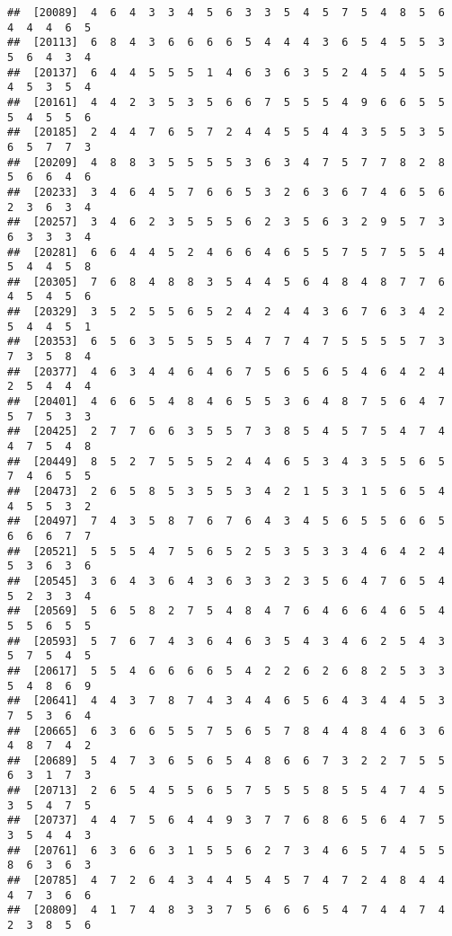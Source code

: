 \documentclass[
]{book}
\begin{document}
\begin{verbatim}
##  [20089]  4  6  4  3  3  4  5  6  3  3  5  4  5  7  5  4  8  5  6  4  4  4  6  5
##  [20113]  6  8  4  3  6  6  6  6  5  4  4  4  3  6  5  4  5  5  3  5  6  4  3  4
##  [20137]  6  4  4  5  5  5  1  4  6  3  6  3  5  2  4  5  4  5  5  4  5  3  5  4
##  [20161]  4  4  2  3  5  3  5  6  6  7  5  5  5  4  9  6  6  5  5  5  4  5  5  6
##  [20185]  2  4  4  7  6  5  7  2  4  4  5  5  4  4  3  5  5  3  5  6  5  7  7  3
##  [20209]  4  8  8  3  5  5  5  5  3  6  3  4  7  5  7  7  8  2  8  5  6  6  4  6
##  [20233]  3  4  6  4  5  7  6  6  5  3  2  6  3  6  7  4  6  5  6  2  3  6  3  4
##  [20257]  3  4  6  2  3  5  5  5  6  2  3  5  6  3  2  9  5  7  3  6  3  3  3  4
##  [20281]  6  6  4  4  5  2  4  6  6  4  6  5  5  7  5  7  5  5  4  5  4  4  5  8
##  [20305]  7  6  8  4  8  8  3  5  4  4  5  6  4  8  4  8  7  7  6  4  5  4  5  6
##  [20329]  3  5  2  5  5  6  5  2  4  2  4  4  3  6  7  6  3  4  2  5  4  4  5  1
##  [20353]  6  5  6  3  5  5  5  5  4  7  7  4  7  5  5  5  5  7  3  7  3  5  8  4
##  [20377]  4  6  3  4  4  6  4  6  7  5  6  5  6  5  4  6  4  2  4  2  5  4  4  4
##  [20401]  4  6  6  5  4  8  4  6  5  5  3  6  4  8  7  5  6  4  7  5  7  5  3  3
##  [20425]  2  7  7  6  6  3  5  5  7  3  8  5  4  5  7  5  4  7  4  4  7  5  4  8
##  [20449]  8  5  2  7  5  5  5  2  4  4  6  5  3  4  3  5  5  6  5  7  4  6  5  5
##  [20473]  2  6  5  8  5  3  5  5  3  4  2  1  5  3  1  5  6  5  4  4  5  5  3  2
##  [20497]  7  4  3  5  8  7  6  7  6  4  3  4  5  6  5  5  6  6  5  6  6  6  7  7
##  [20521]  5  5  5  4  7  5  6  5  2  5  3  5  3  3  4  6  4  2  4  5  3  6  3  6
##  [20545]  3  6  4  3  6  4  3  6  3  3  2  3  5  6  4  7  6  5  4  5  2  3  3  4
##  [20569]  5  6  5  8  2  7  5  4  8  4  7  6  4  6  6  4  6  5  4  5  5  6  5  5
##  [20593]  5  7  6  7  4  3  6  4  6  3  5  4  3  4  6  2  5  4  3  5  7  5  4  5
##  [20617]  5  5  4  6  6  6  6  5  4  2  2  6  2  6  8  2  5  3  3  5  4  8  6  9
##  [20641]  4  4  3  7  8  7  4  3  4  4  6  5  6  4  3  4  4  5  3  7  5  3  6  4
##  [20665]  6  3  6  6  5  5  7  5  6  5  7  8  4  4  8  4  6  3  6  4  8  7  4  2
##  [20689]  5  4  7  3  6  5  6  5  4  8  6  6  7  3  2  2  7  5  5  6  3  1  7  3
##  [20713]  2  6  5  4  5  5  6  5  7  5  5  5  8  5  5  4  7  4  5  3  5  4  7  5
##  [20737]  4  4  7  5  6  4  4  9  3  7  7  6  8  6  5  6  4  7  5  3  5  4  4  3
##  [20761]  6  3  6  6  3  1  5  5  6  2  7  3  4  6  5  7  4  5  5  8  6  3  6  3
##  [20785]  4  7  2  6  4  3  4  4  5  4  5  7  4  7  2  4  8  4  4  4  7  3  6  6
##  [20809]  4  1  7  4  8  3  3  7  5  6  6  6  5  4  7  4  4  7  4  2  3  8  5  6

\end{verbatim}
\end{document}
